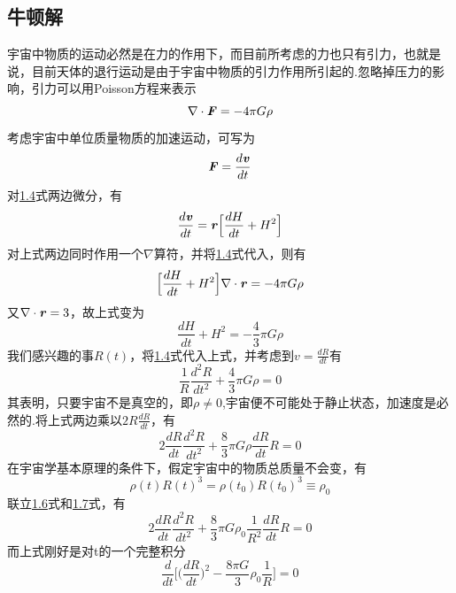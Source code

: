 \documentclass[a4paper]{book}
\newcommand{\xtjc}[1]{\textbf{\textit{#1}}}
\begin{document}
\subsection{牛顿解}
宇宙中物质的运动必然是在力的作用下，而目前所考虑的力也只有引力，也就是说，目前天体的退行运动是由于宇宙中物质的引力作用所引起的.忽略掉压力的影响，引力可以用Poisson方程来表示
\begin{equation}\label{1.10}
	\nabla \cdot \xtjc{F}=-4\pi G\rho
\end{equation}
考虑宇宙中单位质量物质的加速运动，可写为
\begin{equation}
	\xtjc{F}=\frac{d\xtjc{v}}{dt}
\end{equation}
对\hyperref[1.4]{1.4}式两边微分，有
\begin{equation}
	\frac{d\xtjc{v}}{dt}=\xtjc{r}\Big[\frac{dH}{dt}+H^2\Big]
\end{equation}
对上式两边同时作用一个$\nabla$算符，并将\hyperref[1.4]{1.4}式代入，则有
\begin{equation}
	\Big[\frac{dH}{dt}+H^2\Big]\nabla\cdot\xtjc{r}=-4\pi G\rho
\end{equation}
又$\nabla\cdot\xtjc{r}=3$，故上式变为
\begin{equation}
	\frac{dH}{dt}+H^2=-\frac{4}{3}\pi G\rho
\end{equation}
我们感兴趣的事$R(t)$，将\hyperref[1.4]{1.4}式代入上式，并考虑到$v=\frac{dR}{dt}$有
\begin{equation}
	\frac{1}{R}\frac{d^2R}{dt^2}+\frac{4}{3}\pi G\rho=0
\end{equation}
其表明，只要宇宙不是真空的，即$\rho \ne 0$,宇宙便不可能处于静止状态，加速度是必然的.将上式两边乘以$2R\frac{dR}{dt}$，有
\begin{equation}\label{1.16}
2\frac{dR}{dt}\frac{d^2R}{dt^2}+\frac{8}{3}\pi G\rho\frac{dR}{dt}R=0
\end{equation}
在宇宙学基本原理的条件下，假定宇宙中的物质总质量不会变，有
\begin{equation}\label{1.17}
	\rho(t)R(t)^3=\rho(t_0) R(t_0)^3\equiv\rho_0
\end{equation}
联立\hyperref[1.6]{1.6}式和\hyperref[1.7]{1.7}式，有
\begin{equation}
	2\frac{dR}{dt}\frac{d^2R}{dt^2}+\frac{8}{3}\pi G\rho_0\frac{1}{R^2}\frac{dR}{dt}R=0
\end{equation}
而上式刚好是对t的一个完整积分
\begin{equation}
	\frac{d}{dt}\Big[\Big(\frac{dR}{dt}\Big)^2-\frac{8\pi G}{3}\rho_0 \frac{1}{R}\Big]=0
\end{equation}
\end{document}

